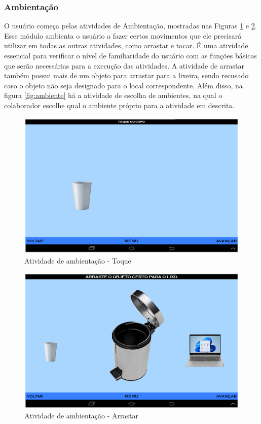 \documentclass[12pt]{article}
\begin{document}
\subsubsection{Ambientação}
O usuário começa pelas atividades de Ambientação, mostradas nas Figuras \ref{fig:ambiente_toque} e \ref{fig:ambiente_arrastar}. Esse módulo ambienta o usuário a fazer certos movimentos que ele precisará utilizar em todas as outras atividades, como arrastar e tocar. É uma atividade essencial para verificar o nível de familiaridade do usuário com as funções básicas que serão necessárias para a execução das atividades. A atividade de arrastar também possui mais de um objeto para arrastar para a lixeira, sendo recusado caso o objeto não seja designado para o local correspondente. Além disso, na figura \ref{fig:ambiente} há a atividade de escolha de ambientes, na qual o colaborador escolhe qual o ambiente próprio para a atividade em descrita.
 \begin{figure}[h!]
    \centering
    \includegraphics[width=1.0\textwidth]{ambiente_toque.png}
    \caption{Atividade de ambientação - Toque}
    \label{fig:ambiente_toque}
\end{figure}
 \begin{figure}[h!]
    \centering
    \includegraphics[width=1.0\textwidth]{ambiente_arrastar.png}
    \caption{Atividade de ambientação - Arrastar}
    \label{fig:ambiente_arrastar}
\end{figure}
\end{document}

